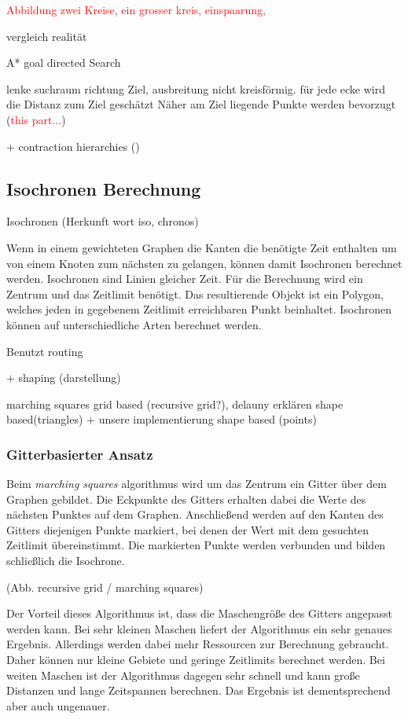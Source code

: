 \documentclass[10pt,a4paper]{article}
\newcommand\todo[1]{\textcolor{red}{#1}}
\begin{document}
\todo{Abbildung zwei Kreise, ein grosser kreis, einspaarung,}

vergleich realität

A*
goal directed Search

lenke suchraum richtung Ziel, ausbreitung nicht kreisförmig.
für jede ecke wird die Distanz zum Ziel geschätzt
Näher am Ziel liegende Punkte werden bevorzugt (\todo{this part...})
\cite[210f]{kurt}

+ contraction hierarchies
(\cite[212]{kurt})

\subsection{Isochronen Berechnung}

Isochronen (Herkunft wort iso, chronos)

Wenn in einem gewichteten Graphen die Kanten die benötigte Zeit enthalten um von einem Knoten zum nächsten zu gelangen, können damit Isochronen berechnet werden.
Isochronen sind Linien gleicher Zeit. Für die Berechnung wird ein Zentrum und das Zeitlimit benötigt. Das resultierende Objekt ist ein Polygon, welches jeden in gegebenem Zeitlimit erreichbaren Punkt beinhaltet.
Isochronen können auf unterschiedliche Arten berechnet werden. 

Benutzt routing

+ shaping (darstellung)

marching squares grid based (recursive grid?), delauny erklären shape based(triangles) + unsere implementierung shape based (points)

\subsubsection{Gitterbasierter Ansatz}
Beim \textit{marching squares} algorithmus wird um das Zentrum ein Gitter über dem Graphen gebildet. Die Eckpunkte des Gitters erhalten dabei die Werte des nächsten Punktes auf dem Graphen. Anschließend werden auf den Kanten des Gitters diejenigen Punkte markiert, bei denen der Wert mit dem gesuchten Zeitlimit übereinstimmt. Die markierten Punkte werden verbunden und bilden schließlich die Isochrone.

(Abb. recursive grid / marching squares)

Der Vorteil dieses Algorithmus ist, dass die Maschengröße des Gitters angepasst werden kann. Bei sehr kleinen Maschen liefert der Algorithmus ein sehr genaues Ergebnis. Allerdings werden dabei mehr Ressourcen zur Berechnung gebraucht. Daher können nur kleine Gebiete und geringe Zeitlimits berechnet werden. Bei weiten Maschen ist der Algorithmus dagegen sehr schnell und kann große Distanzen und lange Zeitspannen berechnen. Das Ergebnis ist dementsprechend aber auch ungenauer.
\end{document}
